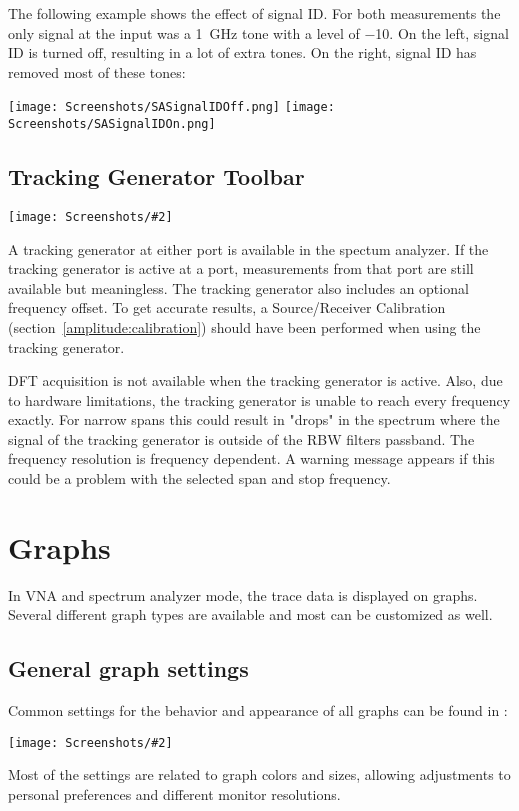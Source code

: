 \documentclass[a4paper,11pt]{article}
\newcommand{\screenshot}[2]{\begin{center}
\texttt{[image: Screenshots/\#2]}
\end{center}}
\begin{document}
\begin{itemize}
The following example shows the effect of signal ID. For both measurements the only signal at the input was a \SI{1}{\giga\hertz} tone with a level of \SI{-10}{\dBm}. On the left, signal ID is turned off, resulting in a lot of extra tones. On the right, signal ID has removed most of these tones:
\begin{center}
\texttt{[image: Screenshots/SASignalIDOff.png]}
\texttt{[image: Screenshots/SASignalIDOn.png]}
\end{center}
\end{itemize}

\subsection{Tracking Generator Toolbar}
\screenshot{0.8}{ToolbarTrackingGenerator.png}
A tracking generator at either port is available in the spectum analyzer. If the tracking generator is active at a port, measurements from that port are still available but meaningless. The tracking generator also includes an optional frequency offset. To get accurate results, a Source/Receiver Calibration (section~\ref{amplitude:calibration}) should have been performed when using the tracking generator.

DFT acquisition is not available when the tracking generator is active. Also, due to hardware limitations, the tracking generator is unable to reach every frequency exactly. For narrow spans this could result in "drops" in the spectrum where the signal of the tracking generator is outside of the RBW filters passband. The frequency resolution is frequency dependent. A warning message appears if this could be a problem with the selected span and stop frequency.

\section{Graphs}
In VNA and spectrum analyzer mode, the trace data is displayed on graphs. Several different graph types are available and most can be customized as well.
\subsection{General graph settings}
Common settings for the behavior and appearance of all graphs can be found in :
\screenshot{1.0}{GraphSettings.png}
Most of the settings are related to graph colors and sizes, allowing adjustments to personal preferences and different monitor resolutions.
\end{document}
